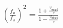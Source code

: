 \documentclass[preview]{standalone}
\begin{document}
\begin{align*}
\left(\frac{f_{o}}{f_{s}}\right)^{2} = \frac{1+\frac{v_{\text{wind}}}{c}}{1-\frac{v_{\text{wind}}}{c}}
\end{align*}
\end{document}

